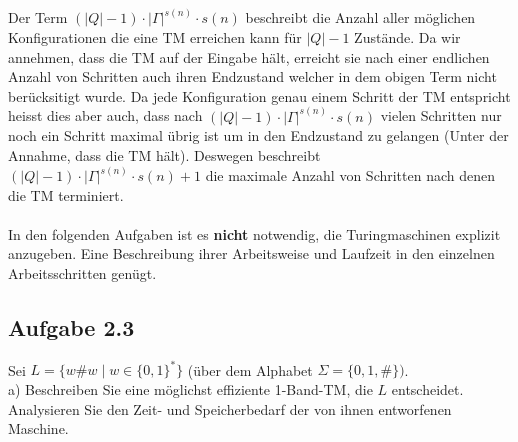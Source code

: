 Der Term $(\left| Q\right| -1) \cdot \left| \Gamma\right|^{s(n)} \cdot s(n)$ beschreibt die Anzahl aller möglichen Konfigurationen
die eine TM erreichen kann für $|Q| - 1$ Zustände. Da wir 
annehmen, dass die TM auf der Eingabe hält, erreicht sie nach 
einer endlichen Anzahl von Schritten auch ihren Endzustand
welcher in dem obigen Term nicht berücksitigt wurde. Da jede
Konfiguration genau einem Schritt der TM entspricht heisst dies
aber auch, dass nach $(\left| Q\right| -1) \cdot \left| \Gamma\right|^{s(n)} \cdot s(n)$ vielen Schritten nur noch ein Schritt
maximal übrig ist um in den Endzustand zu gelangen (Unter der
Annahme, dass die TM hält). Deswegen beschreibt 
$(\left| Q\right| -1) \cdot \left| \Gamma\right|^{s(n)} \cdot s(n)+1$ die maximale Anzahl von Schritten nach denen die TM terminiert.
\\\\


In den folgenden Aufgaben ist es \textbf{nicht} notwendig, die Turingmaschinen explizit anzugeben. Eine Beschreibung ihrer Arbeitsweise und Laufzeit in den einzelnen Arbeitsschritten genügt.

\subsection*{Aufgabe 2.3}
Sei $L=\{w\#w \mid w \in \{0,1\}^*\}$ (über dem Alphabet $\Sigma = \{0,1,\#\})$.\\
a) Beschreiben Sie eine möglichst effiziente 1-Band-TM, die $L$ entscheidet. Analysieren Sie den Zeit- und Speicherbedarf der von ihnen entworfenen Maschine.\\

